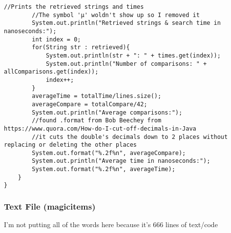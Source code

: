 \documentclass[10pt]{article}
\begin{document}
\begin{lstlisting}[frame=single, ]
        //Prints the retrieved strings and times
        //The symbol 'μ' woldn't show up so I removed it
        System.out.println("Retrieved strings & search time in nanoseconds:");
        int index = 0;
        for(String str : retrieved){
            System.out.println(str + ": " + times.get(index));
            System.out.println("Number of comparisons: " + allComparisons.get(index));
            index++;
        }
        averageTime = totalTime/lines.size();
        averageCompare = totalCompare/42;
        System.out.println("Average comparisons:");
        //found .format from Bob Beechey from https://www.quora.com/How-do-I-cut-off-decimals-in-Java
        //it cuts the double's decimals down to 2 places without replacing or deleting the other places
        System.out.format("%.2f%n", averageCompare);
        System.out.println("Average time in nanoseconds:");
        System.out.format("%.2f%n", averageTime);
    }
}
\end{lstlisting}


\subsubsection{Text File (magicitems)}
\lstset{numbers=left, numberstyle=\tiny, stepnumber=1, numbersep=5pt, basicstyle=\footnotesize\ttfamily}
I'm not putting all of the words here because it's 666 lines of text/code
\end{document}
